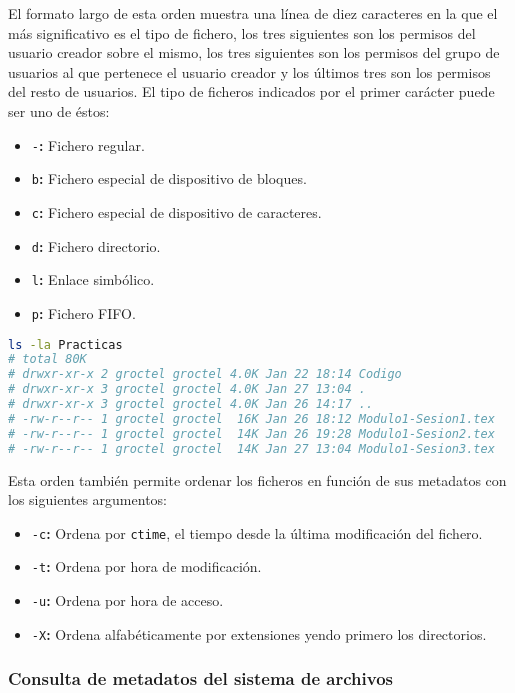 El formato largo de esta orden muestra una línea de diez caracteres en la que el más significativo es el tipo de fichero, los tres siguientes son los permisos del usuario creador sobre el mismo, los tres siguientes son los permisos del grupo de usuarios al que pertenece el usuario creador y los últimos tres son los permisos del resto de usuarios.
El tipo de ficheros indicados por el primer carácter puede ser uno de éstos:

\begin{itemize}
	\item\texttt{-}\textbf{:} Fichero regular.
	\item\texttt{b}\textbf{:} Fichero especial de dispositivo de bloques.
	\item\texttt{c}\textbf{:} Fichero especial de dispositivo de caracteres.
	\item\texttt{d}\textbf{:} Fichero directorio.
	\item\texttt{l}\textbf{:} Enlace simbólico.
	\item\texttt{p}\textbf{:} Fichero FIFO\@.
\end{itemize}

\begin{lstlisting}[language=Bash]
ls -la Practicas
# total 80K
# drwxr-xr-x 2 groctel groctel 4.0K Jan 22 18:14 Codigo
# drwxr-xr-x 3 groctel groctel 4.0K Jan 27 13:04 .
# drwxr-xr-x 3 groctel groctel 4.0K Jan 26 14:17 ..
# -rw-r--r-- 1 groctel groctel  16K Jan 26 18:12 Modulo1-Sesion1.tex
# -rw-r--r-- 1 groctel groctel  14K Jan 26 19:28 Modulo1-Sesion2.tex
# -rw-r--r-- 1 groctel groctel  14K Jan 27 13:04 Modulo1-Sesion3.tex
\end{lstlisting}

Esta orden también permite ordenar los ficheros en función de sus metadatos con los siguientes argumentos:

\begin{itemize}
	\item\texttt{-c}\textbf{:} Ordena por \texttt{ctime}, el tiempo desde la última modificación del fichero.
	\item\texttt{-t}\textbf{:} Ordena por hora de modificación.
	\item\texttt{-u}\textbf{:} Ordena por hora de acceso.
	\item\texttt{-X}\textbf{:} Ordena alfabéticamente por extensiones yendo primero los directorios.
\end{itemize}

\subsubsection{Consulta de metadatos del sistema de archivos}

